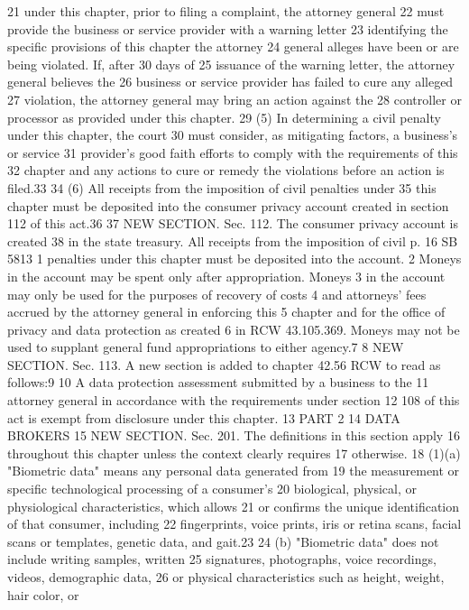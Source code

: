 21 under this chapter, prior to filing a complaint, the attorney general
22 must provide the business or service provider with a warning letter
23 identifying the specific provisions of this chapter the attorney
24 general alleges have been or are being violated. If, after 30 days of
25 issuance of the warning letter, the attorney general believes the
26 business or service provider has failed to cure any alleged
27 violation, the attorney general may bring an action against the
28 controller or processor as provided under this chapter.
29 (5) In determining a civil penalty under this chapter, the court
30 must consider, as mitigating factors, a business's or service
31 provider's good faith efforts to comply with the requirements of this
32 chapter and any actions to cure or remedy the violations before an
action is filed.33
34 (6) All receipts from the imposition of civil penalties under
35 this chapter must be deposited into the consumer privacy account
created in section 112 of this act.36
37 NEW SECTION. Sec. 112. The consumer privacy account is created
38 in the state treasury. All receipts from the imposition of civil
p. 16 SB 5813
1 penalties under this chapter must be deposited into the account.
2 Moneys in the account may be spent only after appropriation. Moneys
3 in the account may only be used for the purposes of recovery of costs
4 and attorneys' fees accrued by the attorney general in enforcing this
5 chapter and for the office of privacy and data protection as created
6 in RCW 43.105.369. Moneys may not be used to supplant general fund
appropriations to either agency.7
8 NEW SECTION. Sec. 113. A new section is added to chapter 42.56
RCW to read as follows:9
10 A data protection assessment submitted by a business to the
11 attorney general in accordance with the requirements under section
12 108 of this act is exempt from disclosure under this chapter.
13 PART 2
14 DATA BROKERS
15 NEW SECTION. Sec. 201. The definitions in this section apply
16 throughout this chapter unless the context clearly requires
17 otherwise.
18 (1)(a) "Biometric data" means any personal data generated from
19 the measurement or specific technological processing of a consumer's
20 biological, physical, or physiological characteristics, which allows
21 or confirms the unique identification of that consumer, including
22 fingerprints, voice prints, iris or retina scans, facial scans or
templates, genetic data, and gait.23
24 (b) "Biometric data" does not include writing samples, written
25 signatures, photographs, voice recordings, videos, demographic data,
26 or physical characteristics such as height, weight, hair color, or
